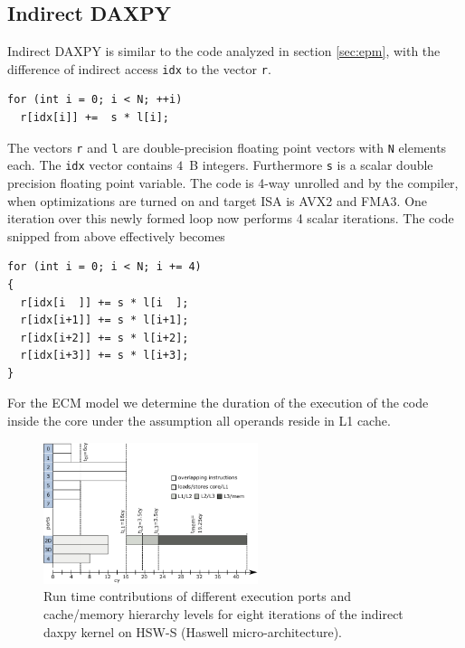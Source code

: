 \subsection{Indirect DAXPY}
\label{sec:ecm-indirect-daxpy}

Indirect DAXPY is similar to the code analyzed in section \ref{sec:epm}, with the difference of indirect access \verb|idx| to the vector \verb|r|.

%
\begin{lstlisting}
for (int i = 0; i < N; ++i) 
  r[idx[i]] +=  s * l[i];
\end{lstlisting}
%
The vectors \verb'r' and
\verb'l' are double-precision floating point vectors with \verb'N' elements
each. 
The \verb'idx' vector contains $4$~B integers.
Furthermore \verb's' is a scalar double precision floating point variable.
%
The code is 4-way unrolled and by the compiler, when
optimizations are turned on and target ISA is AVX2 and FMA3. One iteration
over this newly formed loop now performs 4 scalar iterations. The code snipped
from above effectively becomes
%
\begin{lstlisting}
for (int i = 0; i < N; i += 4)
{
  r[idx[i  ]] += s * l[i  ];
  r[idx[i+1]] += s * l[i+1];
  r[idx[i+2]] += s * l[i+2];
  r[idx[i+3]] += s * l[i+3];
}
\end{lstlisting}
%
For the ECM model we determine the duration of the execution of the code inside
the core under the assumption all operands reside in L1 cache.

\begin{figure}[t]
  \centering
  \includegraphics[width=0.56\textwidth,clip=true]{images/ecm-hsw-daxpy-indirect}
  \caption{Run time contributions of different execution ports and cache/memory
hierarchy levels for eight iterations of the indirect daxpy kernel on HSW-S (Haswell micro-architecture).}
  \label{fig:daxpy-indirect:ecm}
\end{figure}

